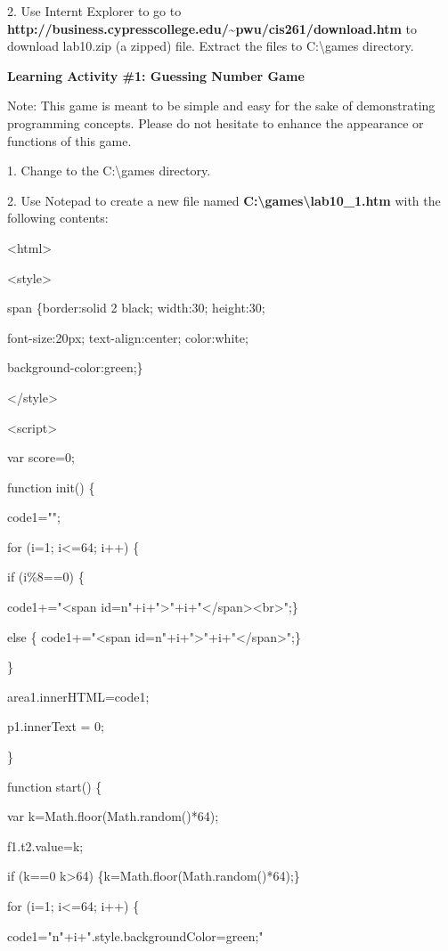 \documentclass[
]{article}
\begin{document}
2. Use Internt Explorer to go to
\textbf{http://business.cypresscollege.edu/\textasciitilde pwu/cis261/download.htm}
to download lab10.zip (a zipped) file. Extract the files to
C:\textbackslash games directory.

\textbf{Learning Activity \#1: Guessing Number Game}

Note: This game is meant to be simple and easy for the sake of
demonstrating programming concepts. Please do not hesitate to enhance
the appearance or functions of this game.

1. Change to the C:\textbackslash games directory.

2. Use Notepad to create a new file named
\textbf{C:\textbackslash games\textbackslash lab10\_1.htm} with the
following contents:

\textless html\textgreater{}

\textless style\textgreater{}

span \{border:solid 2 black; width:30; height:30;

font-size:20px; text-align:center; color:white;

background-color:green;\}

\textless/style\textgreater{}

\textless script\textgreater{}

var score=0;

function init() \{

code1="";

for (i=1; i\textless=64; i++) \{

if (i\%8==0) \{

code1+="\textless span
id=n"+i+"\textgreater"+i+"\textless/span\textgreater\textless br\textgreater";\}

else \{ code1+="\textless span
id=n"+i+"\textgreater"+i+"\textless/span\textgreater";\}

\}

area1.innerHTML=code1;

p1.innerText = 0;

\}

function start() \{

var k=Math.floor(Math.random()*64);

f1.t2.value=k;

if (k==0 \textbar\textbar{} k\textgreater64)
\{k=Math.floor(Math.random()*64);\}

for (i=1; i\textless=64; i++) \{

code1="n"+i+".style.backgroundColor=\textquotesingle green\textquotesingle;"
\end{document}
